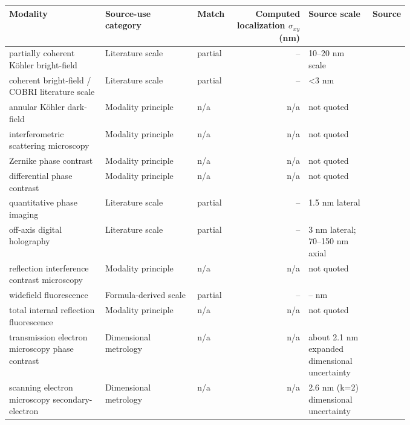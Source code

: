 \begin{tabular}{p{0.24\linewidth}p{0.23\linewidth}p{0.07\linewidth}r p{0.16\linewidth}p{0.07\linewidth}}
\toprule
Modality & Source-use category & Match & Computed localization $\sigma_{xy}$ (nm) & Source scale & Source \\
\midrule
partially coherent Köhler bright-field & Literature scale & partial & -- & 10--20 nm scale & \cite{kovari-brightfield-3d} \\
coherent bright-field / COBRI literature scale & Literature scale & partial & -- & <3 nm & \cite{huang-cobri-virus} \\
annular Köhler dark-field & Modality principle & n/a & n/a & not quoted & \cite{ando-darkfield-angstrom} \\
interfero\allowbreak{}metric scattering microscopy & Modality principle & n/a & n/a & not quoted & \cite{juffmann-iscat-cobri-crlb} \\
Zernike phase contrast & Modality principle & n/a & n/a & not quoted & \cite{kurata-zernike-phase-retrieval} \\
differential phase contrast & Modality principle & n/a & n/a & not quoted & \cite{tian-waller-dpc} \\
quantitative phase imaging & Literature scale & partial & -- & 1.5 nm lateral & \cite{bon-qpi-nanoparticles} \\
off-axis digital holography & Literature scale & partial & -- & 3 nm lateral; 70--150 nm axial & \cite{verpillat-dhm-gold} \\
reflection interference contrast microscopy & Modality principle & n/a & n/a & not quoted & \cite{clack-groves-ricm} \\
widefield fluorescence & Formula-derived scale & partial & -- & -- nm & \cite{thompson-larson-webb} \\
total internal reflection fluorescence & Modality principle & n/a & n/a & not quoted & \cite{axelrod-tirf} \\
transmission electron microscopy phase contrast & Dimensional metrology & n/a & n/a & about 2.1 nm expanded dimensional uncertainty & \cite{rice-tem-sizing} \\
scanning electron microscopy secondary-electron & Dimensional metrology & n/a & n/a & 2.6 nm (k=2) dimensional uncertainty & \cite{crouzier-sem-diameter} \\
\bottomrule
\end{tabular}
